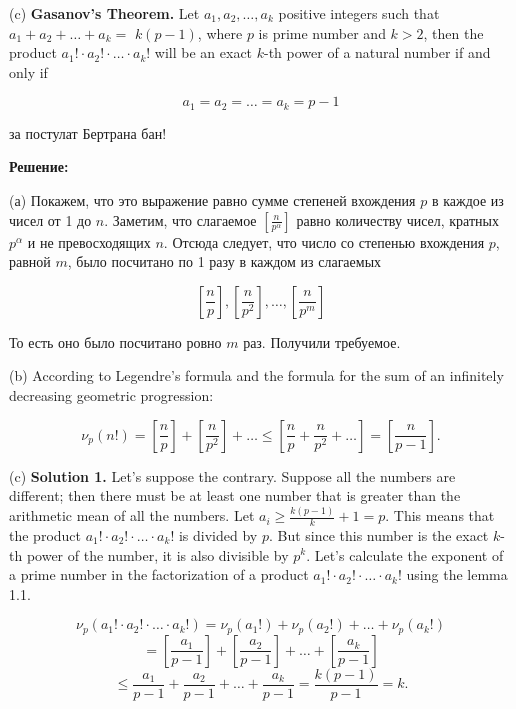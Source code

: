 (c)
\textbf{Gasanov's Theorem.}
Let $a_1, a_2, \ldots, a_k$ positive integers such that $a_1+a_2+\ldots+a_k=$ $k(p-1)$, where $p$ is prime number and $k>2$, then the product $a_{1}!\cdot a_{2}!\cdot \ldots \cdot a_{k}!$ will be an exact $k$-th power of a natural number if and only if

$$
a_1=a_2=\ldots=a_k=p-1
$$

\begin{flushright}
        \scriptsize{за постулат Бертрана бан!}
\end{flushright}

\textbf{Решение:}

(а) Покажем, что это выражение равно сумме степеней вхождения $p$ в каждое из чисел от 1 до $n$. Заметим, что слагаемое $\left[\frac{n}{p^\alpha}\right]$ равно количеству чисел, кратных $p^\alpha$ и не превосходящих $n$. Отсюда следует, что число со степенью вхождения $p$, равной $m$, было посчитано по 1 разу в каждом из слагаемых

$$
\left[\frac{n}{p}\right],\left[\frac{n}{p^2}\right], \ldots,\left[\frac{n}{p^m}\right]
$$


То есть оно было посчитано ровно $m$ раз. Получили требуемое.

(b) According to Legendre's formula and the formula for the sum of an infinitely decreasing geometric progression:
    
\[\nu_p(n!) = \left[ \frac{n}{p} \right] + 
                    \left[ \frac{n}{p^2} \right] +
                    \ldots \leq
                    \left[\frac{n}{p} + \frac{n}{p^2} + \ldots \right] = 
                    \left[ \frac{n}{p-1} \right].\]

(c) \textbf{Solution 1.} 
Let's suppose the contrary. Suppose all the numbers are different; then there must be at least one number that is greater than the arithmetic mean of all the numbers. Let $a_i \geq \frac{k(p-1)}{k} + 1 = p.$ This means that the product $a_1! \cdot a_2! \cdot \ldots \cdot a_k!$ is divided by $p$. But since this number is the exact $k$-th power of the number, it is also divisible by $p^{k}$. Let's calculate the exponent of a prime number in the factorization of a product $a_1! \cdot a_2! \cdot \ldots \cdot a_k!$ using the lemma 1.1.   

    \[\nu_p(a_1! \cdot a_2! \cdot \ldots \cdot a_k!) =
    \nu_p(a_1!) + \nu_p(a_2!) + \ldots + \nu_p(a_k!) \] 
    \[=\left[ \frac{a_1}{p-1} \right]+\left[ \frac{a_2}{p-1} \right] + \ldots +\left[ \frac{a_k}{p-1} \right]  \] 
    \[\leq\frac{a_1}{p-1} + \frac{a_2}{p-1} + \ldots + \frac{a_k}{p-1} = \frac{k(p-1)}{p-1} = k.\]    


